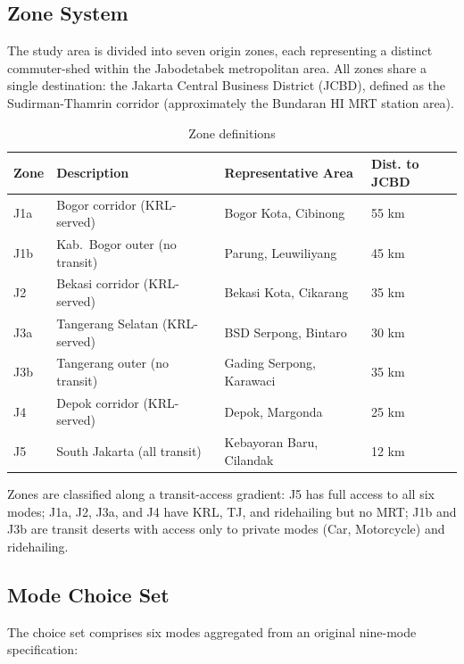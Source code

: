 \documentclass[12pt,a4paper]{article}
\begin{document}
\subsection{Zone System}

The study area is divided into seven origin zones, each representing a distinct commuter-shed within the Jabodetabek metropolitan area. All zones share a single destination: the Jakarta Central Business District (JCBD), defined as the Sudirman-Thamrin corridor (approximately the Bundaran HI MRT station area).

\begin{table}[ht]
\centering
\caption{Zone definitions}
\label{tab:zones}
\begin{tabular}{llll}
\toprule
Zone & Description & Representative Area & Dist. to JCBD \\
\midrule
J1a & Bogor corridor (KRL-served)      & Bogor Kota, Cibinong         & 55 km \\
J1b & Kab.\ Bogor outer (no transit)   & Parung, Leuwiliyang          & 45 km \\
J2  & Bekasi corridor (KRL-served)     & Bekasi Kota, Cikarang        & 35 km \\
J3a & Tangerang Selatan (KRL-served)   & BSD Serpong, Bintaro         & 30 km \\
J3b & Tangerang outer (no transit)     & Gading Serpong, Karawaci     & 35 km \\
J4  & Depok corridor (KRL-served)      & Depok, Margonda              & 25 km \\
J5  & South Jakarta (all transit)      & Kebayoran Baru, Cilandak     & 12 km \\
\bottomrule
\end{tabular}
\end{table}

Zones are classified along a transit-access gradient: J5 has full access to all six modes; J1a, J2, J3a, and J4 have KRL, TJ, and ridehailing but no MRT; J1b and J3b are transit deserts with access only to private modes (Car, Motorcycle) and ridehailing.

\subsection{Mode Choice Set}

The choice set comprises six modes aggregated from an original nine-mode specification:
\end{document}
